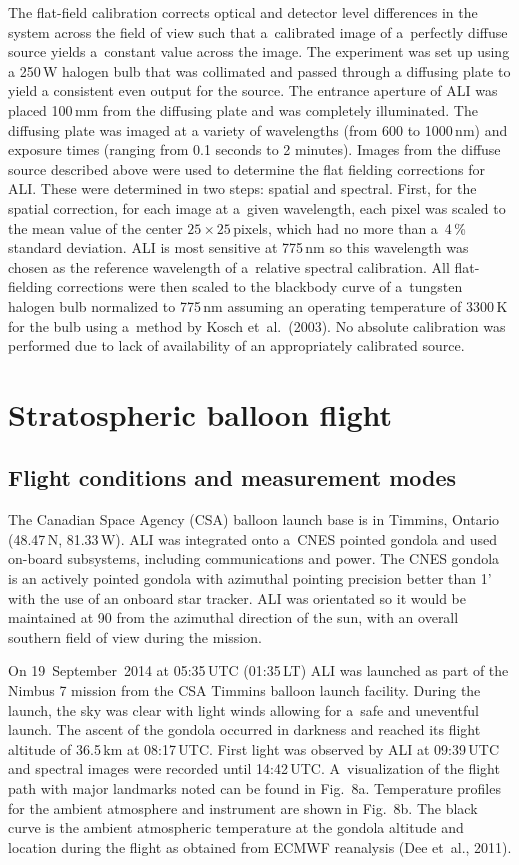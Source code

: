 \documentclass[amtd, online, hvmath]{copernicus}
\begin{document}
The flat-field calibration corrects optical and detector level
differences in the system across the field of view such that
a~calibrated image of a~perfectly diffuse source yields a~constant
value across the image. The experiment was set up using a 250\,W halogen bulb that was collimated and passed through a diffusing plate to yield a consistent even output for the source. The entrance aperture of ALI was placed 100\,mm from the diffusing plate and was completely illuminated. The diffusing plate was imaged at a variety of wavelengths (from 600 to 1000\,nm) and exposure times (ranging from 0.1 seconds to 2 minutes). Images from the diffuse source
described above were used to determine the flat fielding corrections
for ALI. These were determined in two steps: spatial and
spectral. First, for the spatial correction, for each image at a~given
wavelength, each pixel was scaled to the mean value of the center
$25\times 25$\,pixels, which had no more than a~4\,{\%} standard
deviation. ALI is most sensitive at 775\,\unit{nm} so this wavelength
was chosen as the reference wavelength of a~relative spectral
calibration. All flat-fielding corrections were then scaled to the
blackbody curve of a~tungsten halogen bulb normalized to
775\,\unit{nm} assuming an operating temperature of 3300\,\unit{K} for
the bulb using a~method by Kosch et~al.~(2003). No absolute
calibration was performed due to lack of availability of an
appropriately calibrated source.

\section{Stratospheric balloon flight}
\subsection{Flight conditions and measurement modes}

The Canadian Space Agency (CSA) balloon launch base is in Timmins,
Ontario (48.47{\degree}\,N, 81.33{\degree}\,W). ALI was integrated
onto a~CNES pointed gondola and used on-board subsystems, including
communications and power. The CNES gondola is an actively pointed
gondola with azimuthal pointing precision better than 1' with the use
of an onboard star tracker. ALI was orientated so it would be
maintained at 90{\degree} from the azimuthal direction of the sun,
with an overall southern field of view during the mission.

On 19~September~2014 at 05:35\,UTC (01:35\,LT) ALI was launched as
part of the Nimbus 7 mission from the CSA Timmins balloon launch
facility.  During the launch, the sky was clear with light winds
allowing for a~safe and uneventful launch. The ascent of the gondola
occurred in darkness and reached its flight altitude of
36.5\,\unit{km} at 08:17\,UTC. First light was observed by ALI at
09:39\,UTC and spectral images were recorded until 14:42\,UTC.
A~visualization of the flight path with major landmarks noted can be
found in Fig.~8a. Temperature profiles for the ambient atmosphere and
instrument are shown in Fig.~8b. The black curve is the ambient
atmospheric temperature at the gondola altitude and location during
the flight as obtained from ECMWF reanalysis (Dee et~al., 2011).
\end{document}
